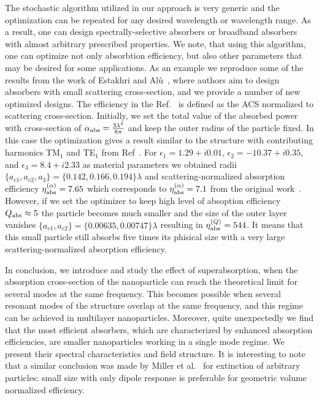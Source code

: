 \documentclass[aps,prl,twocolumn,showpacs,superscriptaddress,groupedaddress]{revtex4-1}  %
\begin{document}
The stochastic algorithm utilized in our approach is very generic and
the optimization can be repeated for any desired wavelength or
wavelength range.  As a result, one can design spectrally-selective
absorbers or broadband absorbers with almost arbitrary prescribed
properties. We note, that using this algorithm, one can optimize not
only absorbtion efficiency, but also other parameters that may be
desired for some applications. As an example we reproduce some of the
results from the work of Estakhri and Al\`u~\cite{Alu-2014}, where
authors aim to design absorbers with small scattering cross-section,
and we provide a number of new optimized designs. The efficiency in
the Ref.~\cite{Alu-2014} is defined as the ACS normalized to
scattering cross-section. Initially, we set the total value of the
absorbed power with cross-section of $\alpha_{\rm
  abs}=\frac{3\lambda^2}{8\pi}$ and keep the outer radius of the
particle fixed. In this case the optimization gives a result similar
to the structure with contributing harmonics TM${_1}$ and TE$_1$ from
Ref~\cite{Alu-2014}.  For $\epsilon_1 = 1.29+i0.01$, $\epsilon_2 =
-10.37+ i0.35$, and $\epsilon_3=8.4+i2.33$ as material parameters we
obtained radii $\{a_{c1},a_{c2},a_3\}=\{0.142,0.166,0.194\}\lambda$
and scattering-normalized absorption efficiency $\eta_{\rm
  abs}^{(\alpha)} =7.65$ which corresponds to $\eta_{\rm
  abs}^{(\alpha)} =7.1$ from the original work~\cite{Alu-2014}.
However, if we set the optimizer to keep high level of absoption
efficiency $Q_{\rm abs} \approx 5$ the particle becomes much smaller
and the size of the outer layer vanishes
$\{a_{c1},a_{c2}\}=\{0.00635,0.00747\}\lambda$ resulting in $\eta_{\rm
  abs}^{(Q)} =544$.  It means that this small particle still absorbs
five times its phisical size with a very large scattering-normalized
absorption efficiency.



In conclusion, we introduce and study the effect of superabsorption,
when the absorption cross-section of the nanoparticle can reach the
theoretical limit for several modes at the same frequency. This
becomes possible when several resonant modes of the structure overlap
at the same frequency, and this regime can be achieved in multilayer
nanoparticles. Moreover, quite unexpectedly we find that the most
efficient absorbers, which are characterized by enhanced absorption
efficiencies, are smaller nanoparticles working in a single mode
regime. We present their spectral characteristics and field structure.
It is interesting to note that a similar conclusion was made by Miller
et al.~\cite{Miller-2014} for extinction of arbitrary particles: small
size with only dipole response is preferable for geometric volume
normalized efficiency.
\end{document}
